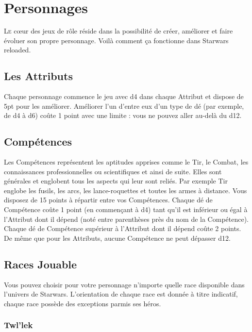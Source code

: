 
\section{Personnages}
\lettrine{L}{e} c\oe{}ur des jeux de rôle réside dans la possibilité de créer, améliorer et faire évoluer son propre personnage. Voilà comment ça fonctionne dans {\jedifont Starwars reloaded}. 

\subsection{Les Attributs}
Chaque personnage commence le jeu avec d4 dans chaque Attribut et dispose de 5pt pour les améliorer. Améliorer l'un d'entre eux d’un type de dé (par exemple, de d4 à d6) coûte 1 point avec une limite : vous ne pouvez aller au-delà du d12.

\subsection{Compétences}
Les Compétences représentent les aptitudes apprises comme le Tir, le Combat, les connaissances professionnelles ou scientifiques et ainsi de suite. Elles sont générales et englobent tous les aspects qui leur sont reliés. Par exemple Tir englobe les fusils, les arcs, les lance-roquettes et toutes les armes à distance. Vous disposez de 15 points à répartir entre vos Compétences. Chaque dé de Compétence coûte 1 point (en commençant à d4) tant qu’il est inférieur ou égal à l’Attribut dont il dépend (noté entre parenthèses près du nom de la Compétence). Chaque dé de Compétence supérieur à l’Attribut dont il dépend coûte 2 points. De même que pour les Attributs, aucune Compétence ne peut dépasser d12.

\subsection{Races Jouable}
Vous pouvez choisir pour votre personnage n’importe quelle race disponible dans l'univers de Starwars. L'orientation de chaque race est donnée à titre indicatif, chaque race possède des exceptions parmis ses héros.










\subsubsection{Twl'lek}
